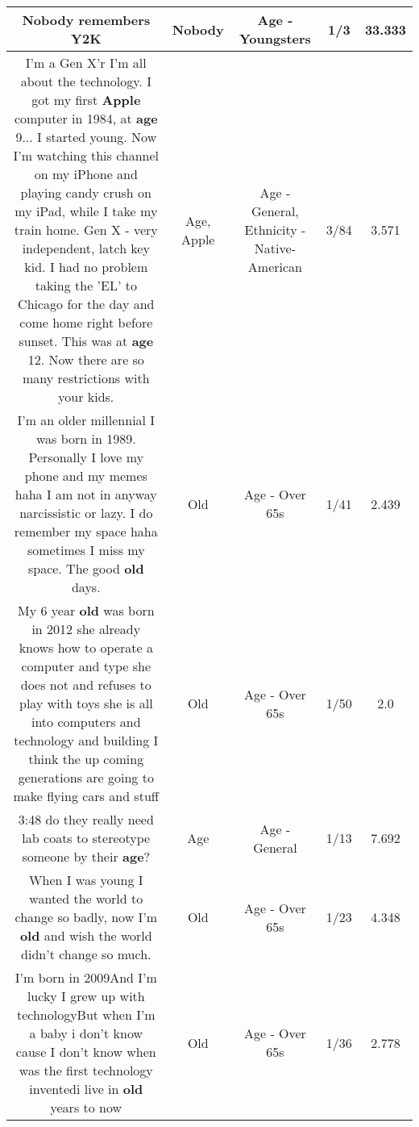\documentclass[11pt]{article}
\newlength\mylength
\begin{document}
\begin{center}
\begin{longtable}{|C{.65\mylength}|C{.30\mylength}|C{.12\mylength}|C{.12\mylength}|C{.12\mylength}|}
  \small Nobody remembers Y2K\normalsize   & Nobody & Age - Youngsters & 1/3 & 33.333 \\  \hline
  \small I'm a Gen X'r I'm all about the technology.  I got my first \textbf{Apple} computer in 1984, at \textbf{age} 9... I started young.   Now I'm watching this channel on my iPhone and playing candy crush on my iPad, while I take my train home.   Gen X - very independent, latch key kid. I had no problem taking the 'EL' to Chicago for the day and come home right before sunset.  This was at \textbf{age} 12.  Now there are so many restrictions with your kids.\normalsize   & Age, Apple & Age - General, Ethnicity - Native-American & 3/84 & 3.571 \\  \hline
  \small I'm an older millennial I was born in 1989. Personally I love my phone and my memes haha I am not in anyway narcissistic or lazy. I do remember my space haha sometimes I miss my space. The good \textbf{old} days.\normalsize   & Old & Age - Over 65s & 1/41 & 2.439 \\  \hline
  \small My 6 year \textbf{old} was born in 2012 she already knows how to operate a computer and type she does not and refuses to play with toys she is all into computers and technology and building I think the up coming generations are going to make flying cars and stuff\normalsize   & Old & Age - Over 65s & 1/50 & 2.0 \\  \hline
  \small \@3:48 do they really need lab coats to stereotype someone by their \textbf{age}?\normalsize   & Age & Age - General & 1/13 & 7.692 \\  \hline
  \small When I was young I wanted the world to change so badly, now I'm \textbf{old} and wish the world didn't change so much.\normalsize   & Old & Age - Over 65s & 1/23 & 4.348 \\  \hline
  \small I'm born in 2009And I'm lucky I grew up with technologyBut when I'm a baby i don't know cause I don't know when was the first technology inventedi live in \textbf{old} years to now\normalsize   & Old & Age - Over 65s & 1/36 & 2.778 \\  \hline

\end{longtable}
\end{center}
\end{document}

